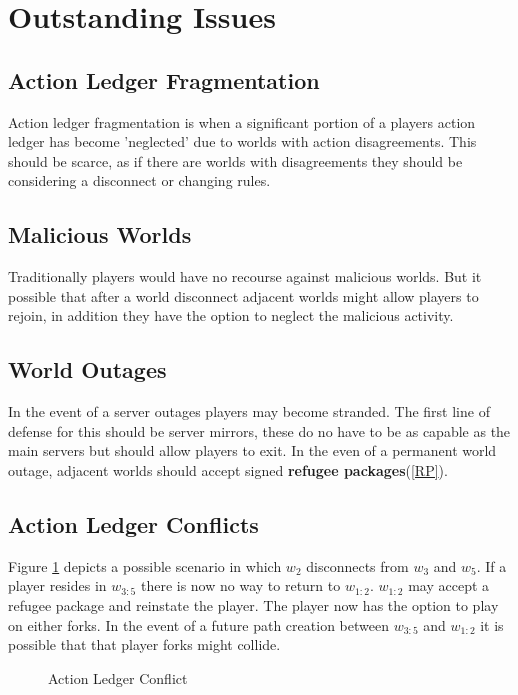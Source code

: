 \documentclass[runningheads,a4paper]{llncs}
\newcommand*{\StrikeThruDistance}{0.15cm}%
\newcommand*{\StrikeThru}{\StrikeThruDistance,\StrikeThruDistance}%
\begin{document}
\section{Outstanding Issues}
\subsection{Action Ledger Fragmentation}
\label{ALF}
Action ledger fragmentation is when a significant portion of a players action ledger has become 'neglected' due to worlds with action disagreements. This should be scarce, as if there are worlds with disagreements they should be considering a disconnect or changing rules.

\subsection{Malicious Worlds}
Traditionally players would have no recourse against malicious worlds. But it possible that after a world disconnect adjacent worlds might allow players to rejoin, in addition they have the option to neglect the malicious activity.

\subsection{World Outages}
\label{WO}
In the event of a server outages players may become stranded. The first line of defense for this should be server mirrors, these do no have to be as capable as the main servers but should allow players to exit. In the even of a permanent world outage, adjacent worlds should accept signed \textbf{refugee packages}(\ref{RP}).

\subsection{Action Ledger Conflicts}
\label{ALC}
Figure \ref{fALC} depicts a possible scenario in which $w_2$ disconnects from $w_3$ and $w_5$. If a player resides in $w_{3:5}$ there is now no way to return to $w_{1:2}$. $w_{1:2}$ may accept a refugee package and reinstate the player. The player now has the option to play on either forks. In the event of a future path creation between $w_{3:5}$ and $w_{1:2}$
it is possible that that player forks might collide.

\begin{figure}
\caption{Action Ledger Conflict}
\label{fALC}
\begin{center}
\end{center}
\end{figure}
\end{document}
